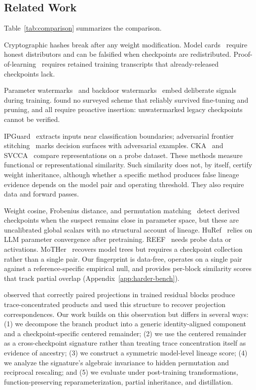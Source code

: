\subsection{Related Work}

Table~\ref{tab:comparison} summarizes the comparison.

Cryptographic hashes break after any weight modification. Model cards~\citep{mitchell2019model} require honest distributors and can be falsified when checkpoints are redistributed. Proof-of-learning~\citep{jia2021proofoflearning} requires retained training transcripts that already-released checkpoints lack.

Parameter watermarks~\citep{uchida2017embedding} and backdoor watermarks~\citep{adi2018turning} embed deliberate signals during training. \citet{lukas2022sok} found no surveyed scheme that reliably survived fine-tuning and pruning, and all require proactive insertion: unwatermarked legacy checkpoints cannot be verified.

IPGuard~\citep{cao2021ipguard} extracts inputs near classification boundaries; adversarial frontier stitching~\citep{lemerrer2020adversarial} marks decision surfaces with adversarial examples. CKA~\citep{kornblith2019similarity} and SVCCA~\citep{raghu2017svcca} compare representations on a probe dataset. These methods measure functional or representational similarity. Such similarity does not, by itself, certify weight inheritance, although whether a specific method produces false lineage evidence depends on the model pair and operating threshold. They also require data and forward passes.

Weight cosine, Frobenius distance, and permutation matching~\citep{ainsworth2023git} detect derived checkpoints when the suspect remains close in parameter space, but these are uncalibrated global scalars with no structural account of lineage. HuRef~\citep{zeng2024huref} relies on LLM parameter convergence after pretraining. REEF~\citep{zhang2024reef} needs probe data or activations. MoTHer~\citep{horwitz2025mother} recovers model trees but requires a checkpoint collection rather than a single pair. Our fingerprint is data-free, operates on a single pair against a reference-specific empirical null, and provides per-block similarity scores that track partial overlap (Appendix~\ref{app:harder-bench}).

\citet{park2026idroppedneuralnet} observed that correctly paired projections in trained residual blocks produce trace-concentrated products and used this structure to recover projection correspondences. Our work builds on this observation but differs in several ways: (1) we decompose the branch product into a generic identity-aligned component and a checkpoint-specific centered remainder; (2) we use the centered remainder as a cross-checkpoint signature rather than treating trace concentration itself as evidence of ancestry; (3) we construct a symmetric model-level lineage score; (4) we analyze the signature's algebraic invariance to hidden permutation and reciprocal rescaling; and (5) we evaluate under post-training transformations, function-preserving reparameterization, partial inheritance, and distillation. 